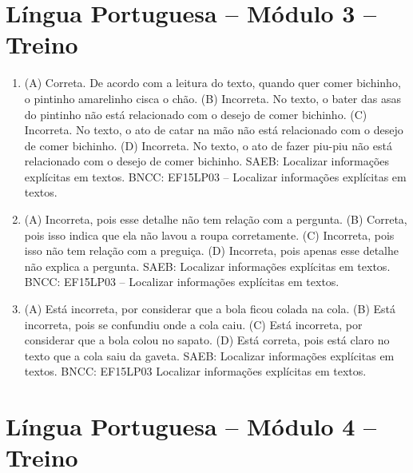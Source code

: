 \section*{Língua Portuguesa – Módulo 3 – Treino}

\begin{enumerate}
\item
(A) Correta. De acordo com a leitura do texto, quando quer comer
bichinho, o pintinho amarelinho cisca o chão.
(B) Incorreta. No texto, o bater das asas do pintinho não está 
relacionado com o desejo de comer bichinho.
(C) Incorreta. No texto, o ato de catar na mão não está 
relacionado com o desejo de comer bichinho.
(D) Incorreta. No texto, o ato de fazer piu-piu não está 
relacionado com o desejo de comer bichinho.
SAEB: Localizar informações explícitas em textos.
BNCC: EF15LP03 -- Localizar informações explícitas em textos.

\item
(A) Incorreta, pois esse detalhe não tem relação com  a pergunta. 
(B) Correta, pois isso indica que ela não lavou a roupa corretamente.
(C) Incorreta, pois isso não tem relação com a preguiça.
(D) Incorreta, pois apenas esse detalhe não explica a pergunta.  
SAEB: Localizar informações explícitas em textos.
BNCC: EF15LP03 -- Localizar informações explícitas em textos.

\item
(A) Está incorreta, por considerar que a bola ficou colada na cola.
(B) Está incorreta, pois se confundiu onde a cola caiu.
(C) Está incorreta, por considerar que a bola colou no sapato.
(D) Está correta, pois está claro no texto que a cola saiu da gaveta.
SAEB: Localizar informações explícitas em textos.
BNCC: EF15LP03 Localizar informações explícitas em textos.
\end{enumerate}

\section*{Língua Portuguesa – Módulo 4 – Treino}

